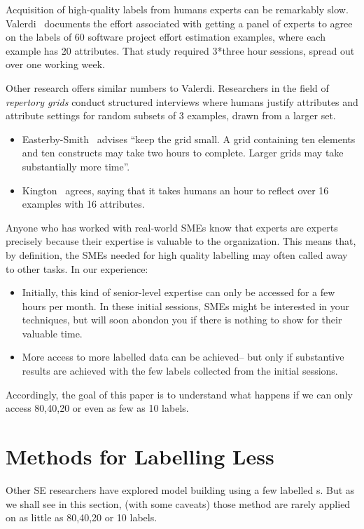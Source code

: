 Acquisition of high-quality labels from humans experts can  be remarkably slow. Valerdi~\cite{valerdi2010heuristics} documents  the effort associated with getting a panel of experts to agree on the labels of 60 software project effort estimation examples, where each example has 20 attributes. That study required 3*three hour sessions, spread out over one working week. 

Other research offers similar numbers to Valerdi. Researchers in the field
    of {\em repertory grids} conduct structured interviews where humans justify attributes and attribute settings for    random subsets of 3 examples, drawn from a larger set. 
    \begin{itemize}
        \item
    Easterby-Smith~\cite{EASTERBYSMITH19803} advises ``keep the grid small. A grid containing ten elements and ten constructs may take two hours to complete. Larger grids may take substantially more time''.
    \item
Kington~\cite{kington2009defining} agrees, saying  that it takes humans an hour to reflect over  16 examples with 16 attributes.
   \end{itemize}
Anyone who has worked with real-world SMEs know that experts are experts precisely because their expertise is valuable to the organization. 
This means that, by definition,
the SMEs needed for high quality labelling may often   called away to other tasks. In our experience:
\begin{itemize}
\item
  Initially, this kind of senior-level expertise can only be accessed for a few hours per month.
  In these initial sessions, SMEs might be interested in your techniques, but will soon abondon you if there is nothing to show for their valuable time.
  \item More access to more labelled data can be achieved--  but only  if substantive results are achieved with the few labels collected from the initial sessions.
  \end{itemize}
Accordingly, the goal of this paper is to understand what happens if we can only access 80,40,20 or even as few as 10  labels.




\section{Methods for Labelling Less}\label{how} 
Other SE researchers have explored    model building
using a few labelled {\eg}s.  But as we shall see in this section,
(with some caveats) those method are rarely applied on as little as 80,40,20 or 10 labels.

